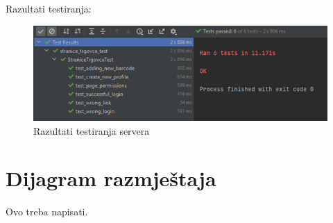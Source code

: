 			Razultati testiranja:
			\begin{figure}[H]
				\centering
				\includegraphics{slike/serverTest.png}
				\caption{Razultati testiranja servera}
				\label{fig:test_server}
			\end{figure}
		\eject
	\section{Dijagram razmještaja}
		Ovo treba napisati.
		\eject
